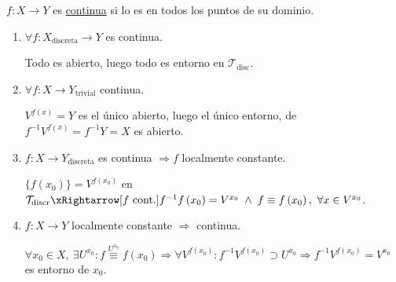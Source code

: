 \begin{defi}
$f: X \rightarrow Y$ es \underline{continua} si lo es en todos los puntos de su dominio.
\end{defi}

\begin{ej}
\begin{enumerate}
    \item $\forall f: X_{\text{discreta}} \rightarrow Y$ es continua. 
    \begin{demo}
        Todo es abierto, luego todo es entorno en $\mathcal{T}_{\text{disc}}$.
    \end{demo}
    \item $\forall f: X \rightarrow Y_{\text{trivial}}$ continua. 
    \begin{demo} 
        $V^{f\left( x \right)} = Y$ es el único abierto, luego el único entorno, de $f^{-1}V^{f\left( x \right)} = f^{-1}Y = X$ es abierto.
    \end{demo}
    \item $f: X \rightarrow Y_{\text{discreta}}$ es continua $\Rightarrow f$ localmente constante.
    \begin{demo}
        $\{f\left( x_0 \right)\} = V^{f\left( x_0 \right)}$ en $\mathcal{T}_{\text{discr}} \xRightarrow[f\text{ cont.}]{} f^{-1}f\left( x_0 \right) = V^{x_0}\; \land \;f \equiv f\left( x_0 \right),\ \forall x \in V^{x_0}$.
    \end{demo}
    \item $f: X \rightarrow Y$ localmente constante $\Rightarrow$ continua.
    \begin{demo}
        $\forall x_0 \in X,\ \exists U^{x_0} : f \stackrel{U^{x_0}}{\equiv} f\left( x_0 \right) \Rightarrow \forall V^{f\left( x_0 \right)}: f^{-1}V^{f\left( x_0 \right)} \supset U^{x_0} \Rightarrow f^{-1}V^{f\left( x_0 \right)} = V^{x_0}$ es entorno de $x_0$.
    \end{demo}
\end{enumerate}
\end{ej}

